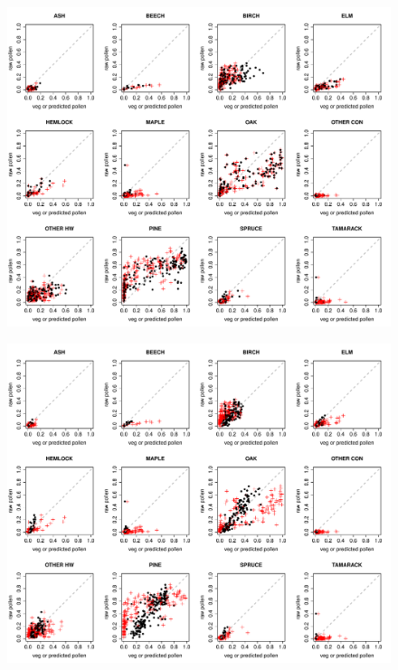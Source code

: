 \begin{figure}
\centering
\includegraphics[width=7in]{figures/pollen_focal_scaled.pdf}
\caption{}
\label{fig:focal_scaled}
\end{figure}

\begin{figure}
\centering
\includegraphics[width=7in]{figures/pollen_preds.pdf}
\caption{}
\label{fig:preds}
\end{figure}

